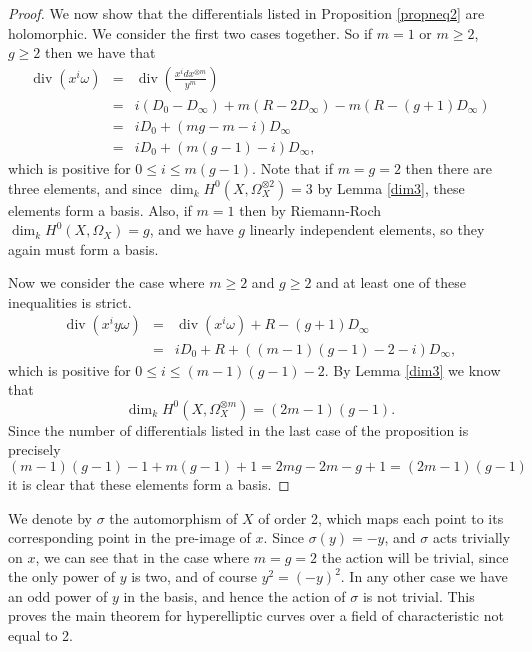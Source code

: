 \documentclass[draft, 11pt]{article} %
\theoremstyle{plain}
\theoremstyle{remark}
\DeclareMathOperator{\di}{div}
\begin{document}
\begin{proof}
We now show that the differentials listed in Proposition \ref{propneq2} are holomorphic.
We consider the first two cases together.
So if $m=1$ or $m\geq 2$, $g\geq 2$ then we have that
\begin{eqnarray*}
 \di(x^i\omega) & = & \di \left( \frac{x^idx^{\otimes m}}{y^m} \right)\\ & = & i(D_0 -D_\infty) + m(R-2D_\infty) -m(R-(g+1)D_\infty) \\
 & = & iD_0 + (mg -m -i)D_\infty \\
 & = & iD_0 + (m(g-1) -i)D_\infty,
\end{eqnarray*}
which is positive for $0\leq i \leq m(g-1)$.
Note that if $m=g=2$ then there are three elements, and since $\dim_kH^0(X,\Omega_X^{\otimes 2})=3$ by Lemma \ref{dim3}, these elements form a basis.
Also, if $m=1$ then by Riemann-Roch $\dim_k H^0(X,\Omega_X)=g$, and we have $g$ linearly independent elements, so they again must form a basis.

\begin{comment}
If $m=g=2$ then we have that
\begin{eqnarray*}
 \di\left(\frac{x^idx^{\otimes 2}}{y^2}\right) & = & i(D_0-D_\infty) + 2(R-2D_\infty) - 2(R-(g+1)D_\infty) \\
 & = & iD_0+ ((2g-2)-i)D_\infty \\
 & = & iD_0 +(2-i)D_\infty,
\end{eqnarray*}
which is positive for $0\leq 2$.
By Lemma \ref{dim3} then $\dim_kH^0(X,\Omega_X^{\otimes 2})=3$, so again, we have three linearly independent elements, so they must form a basis.
\end{comment}


Now we consider the case where $m\geq 2$ and $g \geq 2$ and at least one of these inequalities is strict.
\begin{eqnarray*}
 \di (x^iy\omega) & = & \di(x^i\omega) + R -(g+1)D_\infty \\
 & = & iD_0 + R +((m-1)(g-1)-2-i)D_\infty,
\end{eqnarray*}
which is positive for $0\leq i \leq (m-1)(g-1)-2$.
By Lemma \ref{dim3} we know that 
\[
\dim_kH^0(X,\Omega_X^{\otimes m}) = (2m-1)(g-1).
\]
Since the number of differentials listed in the last case of the proposition is precisely
\[
 (m-1)(g-1)-1 + m(g-1) +1 = 2mg -2m -g + 1 = (2m-1)(g-1)
\]
it is clear that these elements form a basis.
\end{proof}

We denote by $\sigma$ the automorphism of $X$ of order 2, which maps each point to its corresponding point in the pre-image of $x$.
Since $\sigma(y) = -y$, and $\sigma$ acts trivially on $x$, we can see that in the case where $m=g=2$ the action will be trivial, since the only power of $y$ is two, and of course $y^2 = (-y)^2$.
In any other case we have an odd power of $y$ in the basis, and hence the action of $\sigma$ is not trivial.
This proves the main theorem for hyperelliptic curves over a field of characteristic not equal to 2.
\end{document}
